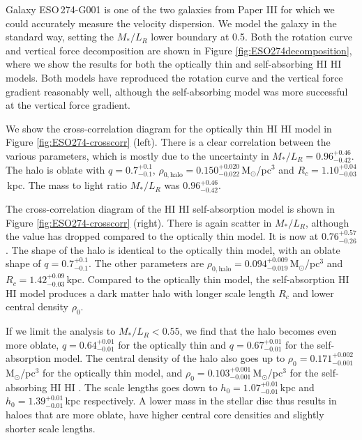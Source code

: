 \documentclass[useAMS,usenatbib]{mn2e}
\newcommand{\hi}{%
  \relax
  \ifmmode
    \textrm{\textsc{HI}}
  \else
    \textsc{H{\smaller}I}
  \fi
}
\begin{document}
Galaxy ESO\,274-G001 is one of the two galaxies from Paper III
for which we could accurately measure the velocity dispersion.
We model the galaxy in the standard way, setting the $M_*/L_{R}$ 
lower boundary at 0.5. 
Both the rotation curve and vertical force decomposition are shown 
in Figure \ref{fig:ESO274decomposition}, where we show the results 
for both the optically thin and self-absorbing \hi models.
Both models have reproduced  the rotation curve and the vertical 
force gradient reasonably well, although the self-absorbing model 
was more successful at the vertical force gradient.

We show the cross-correlation diagram for the optically thin \hi model in
Figure \ref{fig:ESO274-crosscorr} (left).
There is a clear correlation between the various parameters, which is mostly 
due to the uncertainty in $M_*/L_{R}= 0.96^{+0.46}_{-0.42}$.
The halo is oblate with 
$q =0.7^{+0.1}_{-0.1}$, $\rho_{0,\textrm{halo}} = 0.150^{+0.020}_{-0.022}$\,M$_\odot$/pc$^3$ 
and $R_c = 1.10^{+0.04}_{-0.03}$\,kpc.
The mass to light ratio $M_*/L_{R}$ was $0.96^{+0.46}_{-0.42}$.

The cross-correlation diagram of the \hi self-absorption model is shown in 
Figure \ref{fig:ESO274-crosscorr} (right).
There is again scatter in  $M_*/L_{R}$, although the value has dropped
 compared to the optically thin model. It is now at $0.76^{+0.57}_{-0.26}$.
The shape of the halo is identical to the optically thin model, with 
an oblate shape of $q=0.7^{+0.1}_{-0.1}$.
The other parameters are 
$\rho_{0,\textrm{halo}} = 0.094^{+0.009}_{-0.019}$\,M$_\odot$/pc$^3$ 
and $R_c = 1.42^{+0.09}_{-0.03}$\,kpc.
Compared to the optically thin model, the self-absorption \hi model produces a 
dark matter halo with longer scale length $R_c$ and lower central density 
$\rho_0$.

If we limit the analysis to $M_*/L_R<0.55$, we find that the halo becomes 
even more oblate, 
$q = 0.64_{-0.01}^{+0.01}$ for the optically thin and 
$q =0.67_{-0.01}^{+0.01}$ for the self-absorption model.
The central density of the halo also goes up to 
$\rho_0 = 0.171_{-0.001}^{+0.002}$\,M$_\odot$/pc$^3$ for the optically thin model, 
and 
$\rho_0 = 0.103_{-0.001}^{+0.001}$\,M$_\odot$/pc$^3$ for the self-absorbing \hi.
The scale lengths goes down to 
$h_0 = 1.07_{-0.01}^{+0.01}$\,kpc and 
$h_0 = 1.39_{-0.01}^{+0.01}$\,kpc respectively.
A lower mass in the stellar disc thus results in haloes that are more oblate, 
have higher central core densities and slightly shorter scale lengths.
\end{document}
